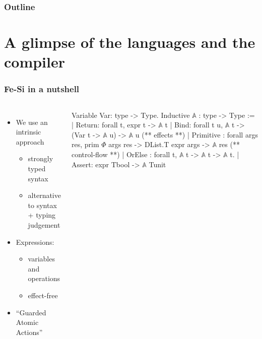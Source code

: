 \documentclass[9pt]{beamer}
\begin{document}

\begin{frame}
  \frametitle{Outline}       
  \tableofcontents  
\end{frame}



\section{A glimpse of the languages and the compiler}

\begin{frame}[fragile]
  \frametitle{Fe-Si in a nutshell}
  \begin{columns}
  \begin{itemize}
  \item  We use an \alert{intrinsic approach}
    \begin{itemize}
    \item strongly typed syntax
    \item alternative to syntax + typing judgement
    \end{itemize}
  \item Expressions:
    \begin{itemize}
    \item  variables and operations
    \item  \alert{effect-free}
    \end{itemize}
    
  \item ``Guarded Atomic Actions''
  \end{itemize}

\begin{coq}
Variable Var: type -> Type. 
Inductive $\mathbb A$ : type -> Type :=
| Return: forall t, expr t -> $\mathbb A$ t
| Bind: forall t u,  $\mathbb A$  t -> (Var t -> $\mathbb A$ u) -> $\mathbb A$ u
(** effects **)
| Primitive : forall args res, prim $\Phi$ args res -> 
  DList.T expr args -> $\mathbb A$ res 
(** control-flow **)
| OrElse : forall t, $\mathbb A$ t -> $\mathbb A$ t -> $\mathbb A$ t.
| Assert: expr Tbool -> $\mathbb A$ Tunit\end{coq}
\end{columns}


\end{frame}
\end{document}
